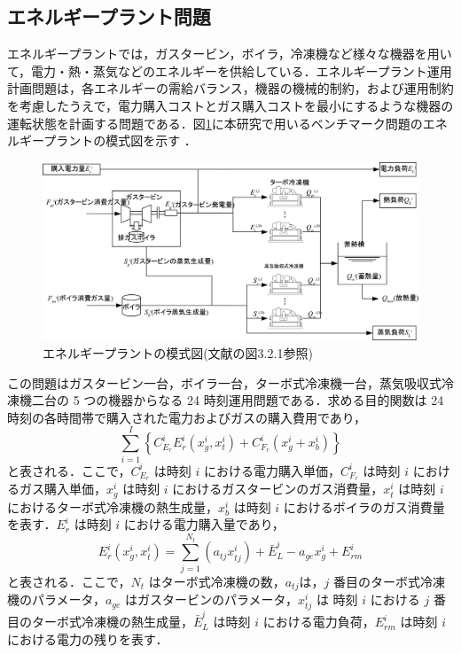 \documentclass[twocolumn]{jarticle}
\begin{document}
    \subsection{エネルギープラント問題}
    エネルギープラントでは，ガスタービン，ボイラ，冷凍機など様々な機器を用いて，電力・熱・蒸気などのエネルギーを供給している．エネルギープラント運用計画問題は，各エネルギーの需給バランス，機器の機械的制約，および運用制約を考慮したうえで，電力購入コストとガス購入コストを最小にするような機器の運転状態を計画する問題である．図\ref{energy_plant}に本研究で用いるベンチマーク問題のエネルギープラントの模式図を示す \cite{denki}．
    \begin{figure}[hbtp]
        \centering
        \includegraphics[keepaspectratio, scale=0.7]
            {energy_plant.png}
        \caption{エネルギープラントの模式図(文献\cite{denki}の図3.2.1参照)}
        \label{energy_plant}
       \end{figure}
    この問題はガスタービン一台，ボイラ一台，ターボ式冷凍機一台，蒸気吸収式冷凍機二台の 5 つの機器からなる 24 時刻運用問題である．求める目的関数は 24 時刻の各時間帯で購入された電力およびガスの購入費用であり，
    \begin{equation}
        \label{fitness}
        \sum_{i=1}^I\left\{C_{E_r}^iE_r^i(x_g^i, x_t^i) + C_{F_r}^i(x_g^i + x_b^i)\right\}
    \end{equation}
    と表される．ここで，$C_{E_r}^i$ は時刻 $i$ における電力購入単価，$C_{F_r}^i$ は時刻 $i$ におけるガス購入単価，$x_g^i$ は時刻 $i$ におけるガスタービンのガス消費量，$x_t^i$ は時刻 $i$ におけるターボ式冷凍機の熱生成量，$x_b^i$ は時刻 $i$ におけるボイラのガス消費量を表す．$E_r^i$ は時刻 $i$ における電力購入量であり，
    \begin{equation}
        \label{E_r}
        E_r^i(x_g^i, x_t^i) = \sum_{j=1}^{N_t}(a_{tj}x_{tj}^i)+\bar{E}_L^i-a_{ge}x_g^i+E_{rm}^i
    \end{equation}
    と表される．ここで，$N_t$ はターボ式冷凍機の数，$a_{tj}$は，$j$ 番目のターボ式冷凍機のパラメータ，$a_{ge}$ はガスタービンのパラメータ，$x_{tj}^i$ は 時刻 $i$ における $j$ 番目のターボ式冷凍機の熱生成量，$\bar{E}_L^i$ は時刻 $i$ における電力負荷，$E_{rm}^i$ は時刻 $i$ における電力の残りを表す．
\end{document}
